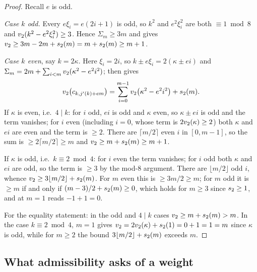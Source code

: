 \begin{proof}
Recall $e$ is odd.

\emph{Case $k$ odd.} Every $e\xi_i = e(2i+1)$ is odd, so $k^2$ and
$e^2\xi_i^2$ are both $\equiv 1 \bmod 8$ and $v_2(k^2 - e^2\xi_i^2) \ge
3$. Hence $\Sigma_m \ge 3m$ and  gives $v_2 \ge 3m -
2m + s_2(m) = m + s_2(m) \ge m+1$.

\emph{Case $k$ even}, say $k = 2\kappa$. Here $\xi_i = 2i$, so $k \pm
e\xi_i = 2(\kappa \pm ei)$ and $\Sigma_m = 2m + \sum_{i<m}v_2(\kappa^2 -
e^2i^2)$;  then gives
\[
  v_2\bigl(c_{k,j'(k)+em}\bigr)
  = \sum_{i=0}^{m-1} v_2\bigl(\kappa^2 - e^2 i^2\bigr) + s_2(m).
\]
If $\kappa$ is even, i.e.\ $4 \mid k$: for $i$ odd, $ei$ is odd and $\kappa$
even, so $\kappa \pm ei$ is odd and the term vanishes; for $i$ even
(including $i = 0$, whose term is $2v_2(\kappa) \ge 2$) both $\kappa$ and
$ei$ are even and the term is $\ge 2$. There are $\lceil m/2 \rceil$ even
$i$ in $[0,m-1]$, so the sum is $\ge 2\lceil m/2 \rceil \ge m$ and $v_2
\ge m + s_2(m) \ge m+1$.

If $\kappa$ is odd, i.e.\ $k \equiv 2 \bmod 4$: for $i$ even the term
vanishes; for $i$ odd both $\kappa$ and $ei$ are odd, so the term is $\ge 3$
by the mod-$8$ argument. There are $\lfloor m/2 \rfloor$ odd $i$, whence
$v_2 \ge 3\lfloor m/2\rfloor + s_2(m)$. For $m$ even this is $\ge
3m/2 \ge m$; for $m$ odd it is $\ge m$ if and only if $(m-3)/2 +
s_2(m) \ge 0$, which holds for $m \ge 3$ since $s_2 \ge 1$, and
at $m = 1$ reads $-1 + 1 = 0$.

For the equality statement: in the odd and $4 \mid k$ cases $v_2 \ge m +
s_2(m) > m$. In the case $k \equiv 2 \bmod 4$, $m = 1$ gives $v_2 =
2v_2(\kappa) + s_2(1) = 0 + 1 = 1 = m$ since $\kappa$ is odd, while
for $m \ge 2$ the bound $3\lfloor m/2\rfloor + s_2(m)$ exceeds $m$.
\end{proof}

\subsection{What admissibility asks of a weight}
\label{sec:admissibility}


